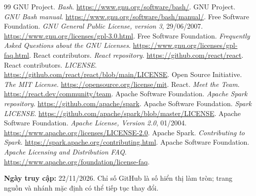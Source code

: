 \documentclass[12pt,a4paper]{article}
\begin{document}
\clearpage
\begin{thebibliography}{99}\small
{} GNU Project. \textit{Bash}. \url{https://www.gnu.org/software/bash/}.
 GNU Project. \textit{GNU Bash manual}. \url{https://www.gnu.org/software/bash/manual/}.
 Free Software Foundation. \textit{GNU General Public License, version 3}, 29/06/2007. \url{https://www.gnu.org/licenses/gpl-3.0.html}.
 Free Software Foundation. \textit{Frequently Asked Questions about the GNU Licenses}. \url{https://www.gnu.org/licenses/gpl-faq.html}.
 React contributors. \textit{React repository}. \url{https://github.com/react/react}.
 React contributors. \textit{LICENSE}. \url{https://github.com/react/react/blob/main/LICENSE}.
 Open Source Initiative. \textit{The MIT License}. \url{https://opensource.org/license/mit}.
 React. \textit{Meet the Team}. \url{https://react.dev/community/team}.
 Apache Software Foundation. \textit{Apache Spark repository}. \url{https://github.com/apache/spark}.
 Apache Software Foundation. \textit{Spark LICENSE}. \url{https://github.com/apache/spark/blob/master/LICENSE}.
 Apache Software Foundation. \textit{Apache License, Version 2.0}, 01/2004. \url{https://www.apache.org/licenses/LICENSE-2.0}.
 Apache Spark. \textit{Contributing to Spark}. \url{https://spark.apache.org/contributing.html}.
 Apache Software Foundation. \textit{Apache Licensing and Distribution FAQ}. \url{https://www.apache.org/foundation/license-faq}.
\end{thebibliography}
\noindent\small\textbf{Ngày truy cập:} 22/11/2026. Chỉ số GitHub là số hiển thị làm tròn; trang nguồn và nhánh mặc định có thể tiếp tục thay đổi.
\end{document}
